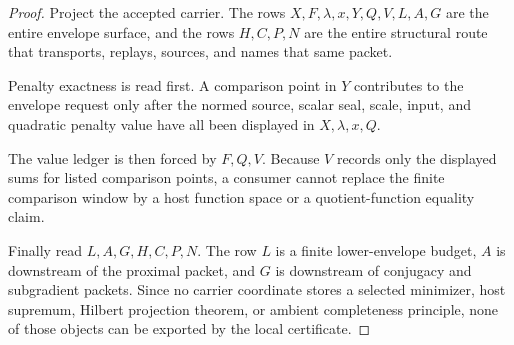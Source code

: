 \begin{proof}
Project the accepted carrier. The rows $X,F,\lambda,x,Y,Q,V,L,A,G$ are the entire envelope surface, and the rows $H,C,P,N$ are the entire structural route that transports, replays, sources, and names that same packet.

Penalty exactness is read first. A comparison point in $Y$ contributes to the envelope request only after the normed source, scalar seal, scale, input, and quadratic penalty value have all been displayed in $X,\lambda,x,Q$.

The value ledger is then forced by $F,Q,V$. Because $V$ records only the displayed sums for listed comparison points, a consumer cannot replace the finite comparison window by a host function space or a quotient-function equality claim.

Finally read $L,A,G,H,C,P,N$. The row $L$ is a finite lower-envelope budget, $A$ is downstream of the proximal packet, and $G$ is downstream of conjugacy and subgradient packets. Since no carrier coordinate stores a selected minimizer, host supremum, Hilbert projection theorem, or ambient completeness principle, none of those objects can be exported by the local certificate.
\end{proof}

